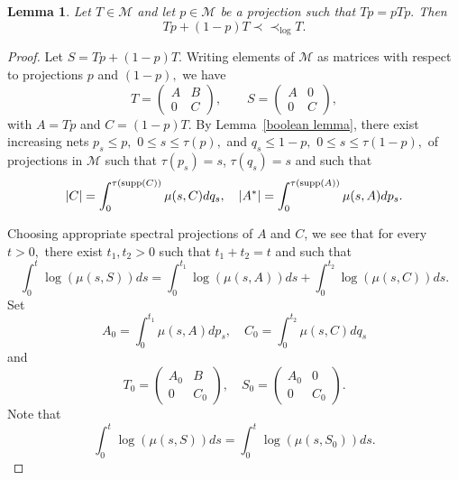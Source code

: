 \documentclass{amsart}
\theoremstyle{plain}
\newtheorem{lem}[thm]{Lemma}
\theoremstyle{remark}
\begin{document}
\begin{lem}\label{lem:anytrace} Let $T\in\mathcal{M}$ and let $p\in\mathcal{M}$ be a projection such that $Tp=pTp.$ Then
$$Tp+(1-p)T\prec\prec_{\log}T.$$
\end{lem}
\begin{proof}
Let $S=Tp+(1-p)T.$ Writing elements of $\mathcal{M}$ as matrices with respect to projections $p$ and $(1-p),$ we have
$$T=\left(\begin{matrix}A&B\\0&C\end{matrix}\right),\qquad S=\left(\begin{matrix}A&0\\0&C\end{matrix}\right),$$
with $A=Tp$ and $C=(1-p)T.$ By Lemma~\ref{boolean lemma}, there exist increasing nets $p_s\le p,$ $0\leq s\leq\tau(p),$ and $q_s\le 1-p,$ $0\leq s\leq\tau(1-p),$ of projections in $\mathcal{M}$ such that $\tau(p_s)=s$, $\tau(q_s)=s$ and such that
$$|C|=\int_0^{\tau({\rm supp}(C))}\mu(s,C)dq_s,\quad |A^*|=\int_0^{\tau({\rm supp}(A))}\mu(s,A)dp_s.$$

Choosing appropriate spectral projections of $A$ and $C$, we see that
for every $t>0,$ there exist $t_1,t_2>0$ such that $t_1+t_2=t$ and such that
\begin{equation}\label{main inequality}
\int_0^t\log(\mu(s,S))ds=\int_0^{t_1}\log(\mu(s,A))ds+\int_0^{t_2}\log(\mu(s,C))ds.
\end{equation}
Set
$$A_0=\int_0^{t_1}\mu(s,A)dp_s,\quad C_0=\int_0^{t_2}\mu(s,C)dq_s$$
and 
$$T_0=\begin{pmatrix}
A_0&B\\
0&C_0
\end{pmatrix},\quad S_0=\begin{pmatrix}
A_0&0\\
0&C_0
\end{pmatrix}.$$
Note that
$$\int_0^t\log(\mu(s,S))ds=\int_0^t\log(\mu(s,S_0))ds.$$


\end{proof}
\end{document}
